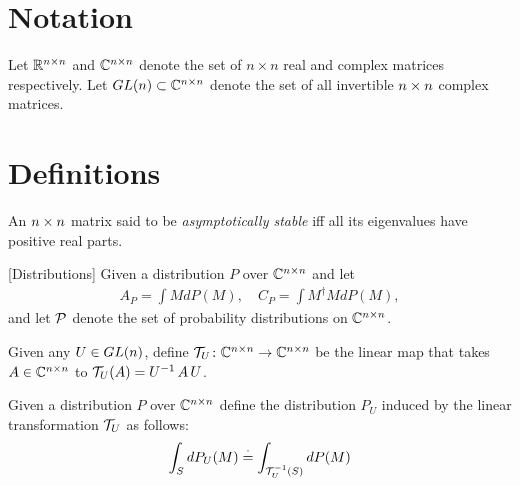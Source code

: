 \documentclass{article}
\begin{document}
\section{Notation}
Let $\R^{\ncn}$ and $\C^{\ncn}$ denote the set of $n\times n$ real and complex matrices respectively. Let $\gln\subset\C^{\ncn}$ denote the set of all invertible $\ncn$ complex matrices.



\section{Definitions}
\begin{definition}
An $\ncn$ matrix said to be \emph{asymptotically stable} iff all its eigenvalues have positive real parts.
\end{definition}

\begin{definition}\label{def:dist}[Distributions]
Given a distribution $P$ over $\C^{\ncn}$ and let
\begin{align*}
A_P=\int M dP(M),\quad C_P=\int M^\dag M dP(M),
\end{align*}
and let $\P$ denote the set of probability distributions on $\C^{\ncn}$.
\end{definition}

\begin{definition}
Given any $U\in \gln$, define $\T_U \colon \C^{\ncn}\rightarrow \C^{\ncn}$ be the linear map that takes $A\in \C^{\ncn}$ to $\T_U(A)=U^{-1}\,A\,U$.
\end{definition}
\begin{definition}
Given a distribution $P$ over $\C^{\ncn}$ define the distribution $P_U$ induced by the linear transformation $\T_U$ as follows:
\begin{align*}
\int_{S} dP_U(M) \eqdef \int_{\T_U^{-1}(S)} dP(M)
\end{align*}
\end{definition}

\begin{comment}
\begin{definition}[Induced Distribution]
Let $P\in \P$ be any distribution over $\R^{\ncn}$ and let $p_c^U$ denote the probability distribution over $\C^{\ncn}$ induced by the linear map $\T_U$ such that the pullback of $p_c^U$ using $\T_U$ is $p$.
\end{definition}
\end{comment}
\end{document}
